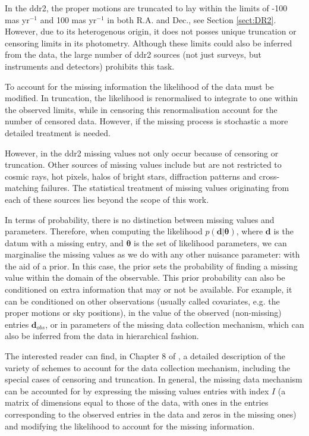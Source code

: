 In the \gls{ddr2}, the proper motions are truncated to lay within the limits of -100 mas yr$^{-1}$ and 100 mas yr$^{-1}$ in both R.A. and Dec., see Section \ref{sect:DR2}. However, due to its heterogenous origin, it does not posses unique truncation or censoring limits in its photometry.  Although these limits could also be inferred from the data, the large number of \gls{ddr2} sources (not just surveys, but instruments and detectors) prohibits this task. 

To account for the missing information the likelihood of the data must be modified. In truncation, the likelihood is renormalised to integrate to one within the observed limits, while in censoring this renormalisation account for the number of censored data. However, if the missing process is stochastic a more detailed treatment is needed. 

However, in the \gls{ddr2} missing values not only occur because of censoring or truncation.  Other sources of missing values include but are not restricted to cosmic rays, hot pixels, halos of bright stars, diffraction patterns and cross-matching failures. The statistical treatment of missing values originating from each of these sources lies beyond the scope of this work. 

In terms of probability, there is no distinction between missing values and parameters. Therefore, when computing the likelihood $p(\mathbf{d}|\boldsymbol{\theta})$, where $\mathbf{d}$ is the datum with a missing entry, and $\boldsymbol{\theta}$ is the set of likelihood parameters, we can marginalise the missing values as we do with any other nuisance parameter: with the aid of a prior. In this case, the prior sets the probability of finding a missing value within the domain of the observable. This prior probability can also be conditioned on extra information that may or not be available. For example, it can be conditioned on other observations (usually called covariates, e.g. the proper motions or sky positions), in the value of the observed (non-missing) entries $\mathbf{d}_{obs}$, or in parameters of the missing data collection mechanism, which can also be inferred from the data in hierarchical fashion.

The interested reader can find, in Chapter 8 of \citet{Gelman2013}, a detailed description of the variety of schemes to account for the data collection mechanism, including the special cases of censoring and truncation. In general, the missing data mechanism can be accounted for by expressing the missing values entries with index $I$ (a matrix of dimensions equal to those of the data, with ones in the entries corresponding to the observed entries in the data and zeros in the missing ones) and modifying the likelihood to account for the missing information.

